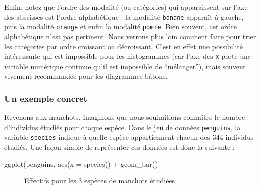 \documentclass[
  a4paper,
  DIV=11,
  numbers=noendperiod,
  oneside]{scrreprt}
\newenvironment{Shaded}{}{}
\newcommand{\AttributeTok}[1]{\textcolor[rgb]{0.84,0.23,0.29}{#1}}
\newcommand{\FunctionTok}[1]{\textcolor[rgb]{0.44,0.26,0.76}{#1}}
\newcommand{\NormalTok}[1]{\textcolor[rgb]{0.14,0.16,0.18}{#1}}
\newcommand{\SpecialCharTok}[1]{\textcolor[rgb]{0.00,0.36,0.77}{#1}}
\begin{document}
Enfin, notez que l'ordre des modalité (ou catégories) qui apparaissent
sur l'axe des abscisses est l'ordre alphabétique : la modalité
\texttt{banane} apparaît à gauche, puis la modalité \texttt{orange} et
enfin la modalité \texttt{pomme}. Bien souvent, cet ordre alphabétique
n'est pas pertinent. Nous verrons plus loin comment faire pour trier les
catégories par ordre croissant ou décroissant. C'est en effet une
possibilité intéressante qui est impossible pour les histogrammes (car
l'axe des \texttt{x} porte une variable numérique continue qu'il est
impossible de ``mélanger''), mais souvent vivement recommandée pour les
diagrammes bâtons.

\subsubsection{Un exemple concret}\label{un-exemple-concret}

Revenons aux manchots. Imaginons que nous souhaitions connaître le
nombre d'individus étudiés pour chaque espèce. Dans le jeu de données
\texttt{penguins}, la variable \texttt{species} indique à quelle espèce
appartiennent chacun des 344 individus étudiés. Une façon simple de
représenter ces données est donc la suivante :

\begin{Shaded}
\begin{Highlighting}[]
\FunctionTok{ggplot}\NormalTok{(penguins, }\FunctionTok{aes}\NormalTok{(}\AttributeTok{x =}\NormalTok{ species)) }\SpecialCharTok{+}
  \FunctionTok{geom\_bar}\NormalTok{()}
\end{Highlighting}
\end{Shaded}

\begin{figure}[H]


\caption{\label{fig-bpspecies}Effectifs pour les 3 espèces de manchots
étudiées}

\end{figure}%
\end{document}
